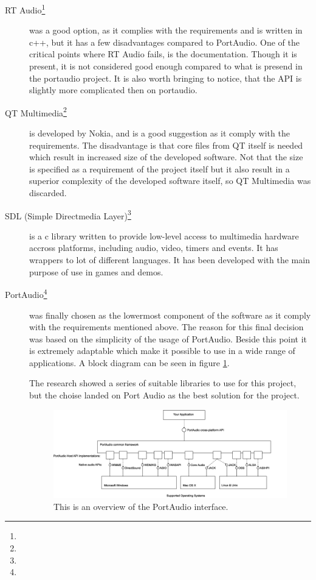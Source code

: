 \begin{description}
\item[RT Audio\footnote{}]
was a good option, as it complies with the requirements and is written in c++, but it has a few disadvantages compared to PortAudio. One of the critical points where RT Audio fails, is the documentation. Though it is present, it is not considered good enough compared to what is presend in the portaudio project. It is also worth bringing to notice, that the API is slightly more complicated then on portaudio.

\item[QT Multimedia\footnote{}] is developed by Nokia, and is a good suggestion as it comply with the requirements. The disadvantage is that core files from QT itself is needed which result in increased size of the developed software. Not that the size is specified as a requirement of the project itself but it also result in a superior complexity of the developed software itself, so QT Multimedia was discarded.

\item[SDL (Simple Directmedia Layer)\footnote{}]
 is a c library written to provide low-level access to multimedia hardware accross platforms, including audio, video, timers and events. It has wrappers to lot of different languages. It has been developed with the main purpose of use in games and demos.


\item[PortAudio\footnote{}] was finally chosen as the lowermost component of the software as it comply with the requirements mentioned above.  The reason for this final decision was based on the simplicity of the usage of PortAudio. Beside this point it is extremely adaptable which make it possible to use in a wide range of applications. A block diagram can be seen in figure \ref{fig:app_portaudio}.


The research showed a series of suitable libraries to use for this project, but the choise landed on Port Audio as the best solution for the project.

\begin{figure}[!h]
	\begin{center}
	\includegraphics[scale=0.4,trim=0 0 0 0]{content/graphics/appendix/portaudio_architecture.png}%
	\caption{This is an overview of the PortAudio interface.}
	\label{fig:app_portaudio}
	\end{center}
\end{figure}
\end{description}